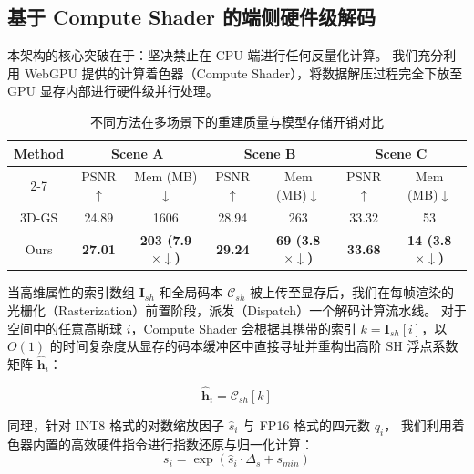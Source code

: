 \subsection{基于 Compute Shader 的端侧硬件级解码}
\label{subsec:gpu_compute_decoding}

本架构的核心突破在于：坚决禁止在 CPU 端进行任何反量化计算。
我们充分利用 WebGPU 提供的计算着色器（Compute Shader），将数据解压过程完全下放至 GPU 显存内部进行硬件级并行处理。

\begin{table}[htbp]
    \centering
    \caption{不同方法在多场景下的重建质量与模型存储开销对比}
    \label{tab:qualitative_comparison_mem_psnr}
    \setlength{\tabcolsep}{6pt}
    \renewcommand{\arraystretch}{1.2}
    \begin{tabular}{c|cc|cc|cc}
        \toprule
        \multirow{2}{*}{Method} 
        & \multicolumn{2}{c|}{Scene A} 
        & \multicolumn{2}{c|}{Scene B} 
        & \multicolumn{2}{c}{Scene C} \\
        \cline{2-7}
        & PSNR$\uparrow$ & Mem (MB)$\downarrow$
        & PSNR$\uparrow$ & Mem (MB)$\downarrow$
        & PSNR$\uparrow$ & Mem (MB)$\downarrow$ \\
        \midrule
        3D-GS 
        & 24.89 & 1606 
        & 28.94 & 263 
        & 33.32 & 53 \\
        Ours 
        & \textbf{27.01} & \textbf{203 (7.9$\times\downarrow$)} 
        & \textbf{29.24} & \textbf{69 (3.8$\times\downarrow$)} 
        & \textbf{33.68} & \textbf{14 (3.8$\times\downarrow$)} \\
        \bottomrule
    \end{tabular}
\end{table}

当高维属性的索引数组 $\mathbf{I}_{sh}$ 和全局码本 $\mathcal{C}_{sh}$ 被上传至显存后，我们在每帧渲染的光栅化（Rasterization）前置阶段，派发（Dispatch）一个解码计算流水线。
对于空间中的任意高斯球 $i$，Compute Shader 会根据其携带的索引 $k = \mathbf{I}_{sh}[i]$，以 $O(1)$ 的时间复杂度从显存的码本缓冲区中直接寻址并重构出高阶 SH 浮点系数矩阵 $\mathbf{\hat{h}}_i$：

\begin{equation}
    \mathbf{\hat{h}}_i = \mathcal{C}_{sh}[k]
\end{equation}

同理，针对 INT8 格式的对数缩放因子 $\hat{s}_i$ 与 FP16 格式的四元数 $q_i$，
我们利用着色器内置的高效硬件指令进行指数还原与归一化计算：
\begin{equation}
    s_i = \exp(\hat{s}_i \cdot \Delta_s + s_{min})
\end{equation}

